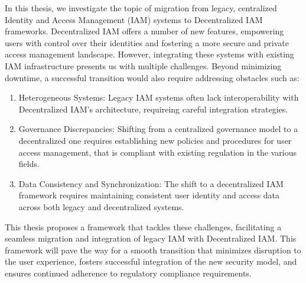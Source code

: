 
%

In this thesis, we investigate the topic of migration from legacy, centralized Identity and Access Management (IAM) 
systems to Decentralized IAM frameworks. 
Decentralized IAM offers a number of new features, empowering users with control over their identities and 
fostering a more secure and private access management landscape. 
However, integrating these systems with existing IAM infrastructure presents us with multiple challenges.
Beyond minimizing downtime, a successful transition would also require addressing obstacles such as:
\begin{enumerate}
  \item Heterogeneous Systems: Legacy IAM systems often lack interoperability with Decentralized IAM's 
  architecture, requireing careful integration strategies.
  \item Governance Discrepancies: Shifting from a centralized governance model to a decentralized one 
  requires establishing new policies and procedures for user access management, that is compliant with
  existing regulation in the various fields.
  \item Data Consistency and Synchronization: The shift to a decentralized IAM framework requires maintaining 
  consistent user identity and access data across both legacy and decentralized systems.
\end{enumerate}

This thesis proposes a framework that tackles these challenges, facilitating a seamless migration and integration 
of legacy IAM with Decentralized IAM. This framework will pave the way for a smooth transition that minimizes 
disruption to the user experience, fosters successful integration of the new security model, 
and ensures continued adherence to regulatory compliance requirements.


